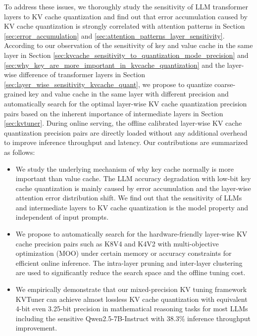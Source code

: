 To address these issues, we thoroughly study the sensitivity of LLM transformer layers to KV cache quantization and find out that error accumulation caused by KV cache quantization is strongly correlated with attention patterns in Section \ref{sec:error_accumulation} and \ref{sec:attention_patterns_layer_sensitivity}. According to our observation of the sensitivity of key and value cache in the same layer in Section \ref{sec:kvcache_sensitivity_to_quantization_mode_precision} and \ref{sec:why_key_are_more_important_in_kvcache_quantization} and the layer-wise difference of transformer layers in Section \ref{sec:layer_wise_sensitivity_kvcache_quant}, we propose to quantize coarse-grained key and value cache in the same layer with different precision and automatically search for the optimal layer-wise KV cache quantization precision pairs based on the inherent importance of intermediate layers in Section \ref{sec:kvtuner}. During online serving, the offline calibrated layer-wise KV cache quantization precision pairs are directly loaded without any additional overhead to improve inference throughput and latency.
Our contributions are summarized as follows:
\begin{itemize}
    \item We study the underlying mechanism of why key cache normally is more important than value cache. The LLM accuracy degradation with low-bit key cache quantization is mainly caused by error accumulation and the layer-wise attention error distribution shift. We find out that the sensitivity of LLMs and intermediate layers to KV cache quantization is the model property and independent of input prompts. 
    \item We propose to automatically search for the hardware-friendly layer-wise KV cache precision pairs such as K8V4 and K4V2 with multi-objective optimization (MOO) under certain memory or accuracy constraints for efficient online inference. The intra-layer pruning and inter-layer clustering are used to significantly reduce the search space and the offline tuning cost. 
    \item We empirically demonstrate that our mixed-precision KV tuning framework KVTuner can achieve almost lossless KV cache quantization with equivalent 4-bit even 3.25-bit precision in mathematical reasoning tasks for most LLMs including the sensitive Qwen2.5-7B-Instruct with 38.3\% inference throughput improvement.
\end{itemize}
